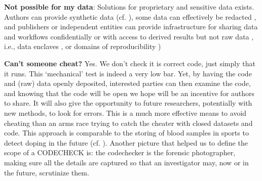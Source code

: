 \documentclass[12pt]{article}
\begin{document}
\textbf{Not possible for my data}: 
Solutions for proprietary and sensitive data exists.
Authors can provide synthetic data (cf. \cite{shannon_opening_2018}), some
data can effectively be redacted \cite{oloughlin_data_2015}, and publishers or
independent entities can provide infrastructure for sharing data and workflows
confidentially \cite{perignon_certify_2019} or with access to derived results
but not raw data \cite{shannon_opening_2018},
i.e., data enclaves \cite{foster_research_2018},
or domains of reproducibility \cite{harris_more_2017})

\textbf{Can't someone cheat?} Yes. We don't check it is correct code,
just simply that it runs. This `mechanical' test is indeed a very low bar.
Yet, by having the code and (raw) data openly deposited, interested parties can
then examine the code, and knowing that the code will be open we hope will
be an incentive for authors to share. It will also give the opportunity 
to future researchers, potentially with new methods, to look for errors.
This is a much more effective means to avoid cheating than an arms race
trying to catch the cheater with closed datasets and code. This approach
is comparable to the storing of blood samples in sports to detect
doping in the future (cf. \cite{everythinghertz97}).
Another picture that helped us to define the scope of a CODECHECK is:
the codechecker is the forensic photographer, making sure all the details
are captured so that an investigator may, now or in the future, scrutinize
them.
\end{document}
